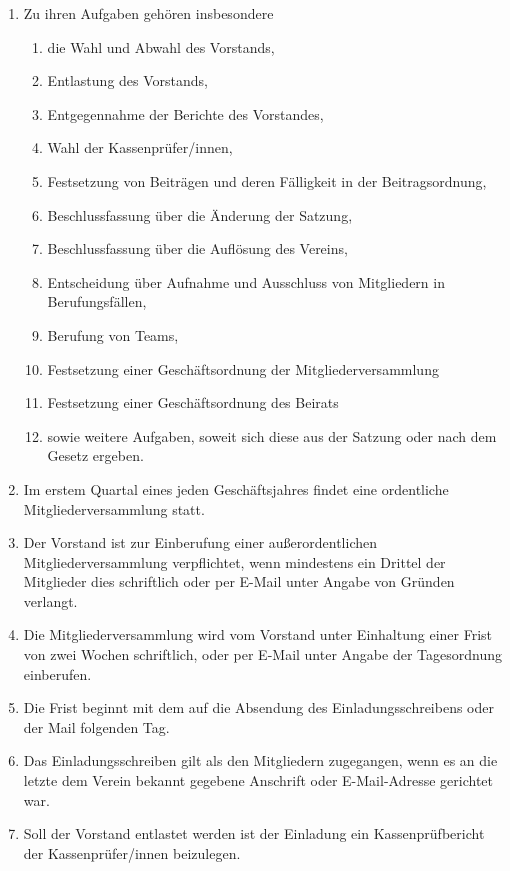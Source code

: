 \documentclass[german]{article}
\begin{document}
\begin{enumerate}
\begin{enumerate}
\item Zu ihren Aufgaben gehören insbesondere
\begin{enumerate}
\item die Wahl und Abwahl des Vorstands,
\item Entlastung des Vorstands,
\item Entgegennahme der Berichte des Vorstandes,
\item Wahl der Kassenprüfer/innen,
\item Festsetzung von Beiträgen und deren Fälligkeit in der Beitragsordnung,
\item Beschlussfassung über die Änderung der Satzung,
\item Beschlussfassung über die Auflösung des Vereins,
\item Entscheidung über Aufnahme und Ausschluss von Mitgliedern in Berufungsfällen,
\item Berufung von Teams,
\item Festsetzung einer Geschäftsordnung der Mitgliederversammlung
\item Festsetzung einer Geschäftsordnung des Beirats
\item sowie weitere Aufgaben, soweit sich diese aus der Satzung oder nach dem Gesetz ergeben.
\end{enumerate}
\item Im erstem Quartal eines jeden Geschäftsjahres findet eine ordentliche Mitgliederversammlung statt.

\item Der Vorstand ist zur Einberufung einer außerordentlichen Mitgliederversammlung verpflichtet, wenn mindestens ein Drittel der Mitglieder dies schriftlich oder per E-Mail unter Angabe von Gründen verlangt.

\item Die Mitgliederversammlung wird vom Vorstand unter Einhaltung einer Frist von zwei Wochen schriftlich, oder per E-Mail unter Angabe der Tagesordnung einberufen.

\item Die Frist beginnt mit dem auf die Absendung des Einladungsschreibens oder der Mail folgenden Tag.

\item Das Einladungsschreiben gilt als den Mitgliedern zugegangen, wenn es an die letzte dem Verein bekannt gegebene Anschrift oder E-Mail-Adresse gerichtet war.

\item Soll der Vorstand entlastet werden ist der Einladung ein Kassenprüfbericht der Kassenprüfer/innen beizulegen.


\end{enumerate}
\end{enumerate}
\end{document}
